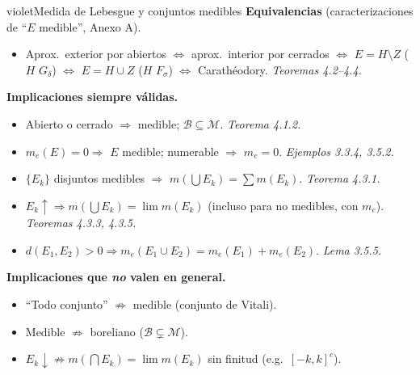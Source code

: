 \documentclass[11pt,twoside]{article}
\begin{document}
\begin{equivbox}{violet}{Medida de Lebesgue y conjuntos medibles}
\textbf{Equivalencias} (caracterizaciones de ``$E$ medible'', Anexo A).
\begin{itemize}[leftmargin=2em,itemsep=2pt]
\item Aprox.\ exterior por abiertos $\Leftrightarrow$ aprox.\ interior por cerrados $\Leftrightarrow$ $E = H \setminus Z$ ($H$ $G_{\delta}$) $\Leftrightarrow$ $E = H \cup Z$ ($H$ $F_{\sigma}$) $\Leftrightarrow$ Carath\'eodory. \hfill\textit{Teoremas 4.2--4.4.}
\end{itemize}
\textbf{Implicaciones siempre v\'alidas.}
\begin{itemize}[leftmargin=2em,itemsep=2pt]
\item Abierto o cerrado $\Rightarrow$ medible; $\mathcal{B} \subseteq \mathcal{M}$. \hfill\textit{Teorema 4.1.2.}
\item $m_{e}(E) = 0 \Rightarrow$ $E$ medible; numerable $\Rightarrow$ $m_{e} = 0$. \hfill\textit{Ejemplos 3.3.4, 3.5.2.}
\item $\{E_{k}\}$ disjuntos medibles $\Rightarrow$ $m(\bigcup E_{k}) = \sum m(E_{k})$. \hfill\textit{Teorema 4.3.1.}
\item $E_{k} \uparrow \Rightarrow m(\bigcup E_{k}) = \lim m(E_{k})$ (incluso para no medibles, con $m_{e}$). \hfill\textit{Teoremas 4.3.3, 4.3.5.}
\item $d(E_{1}, E_{2}) > 0 \Rightarrow m_{e}(E_{1} \cup E_{2}) = m_{e}(E_{1}) + m_{e}(E_{2})$. \hfill\textit{Lema 3.5.5.}
\end{itemize}
\textbf{Implicaciones que \emph{no} valen en general.}
\begin{itemize}[leftmargin=2em,itemsep=2pt]
\item ``Todo conjunto'' $\not\Rightarrow$ medible (conjunto de Vitali).
\item Medible $\not\Rightarrow$ boreliano ($\mathcal{B} \subsetneq \mathcal{M}$).
\item $E_{k} \downarrow \not\Rightarrow m(\bigcap E_{k}) = \lim m(E_{k})$ sin finitud (e.g.\ $[-k,k]^{c}$).
\end{itemize}
\end{equivbox}

\medskip
\end{document}
